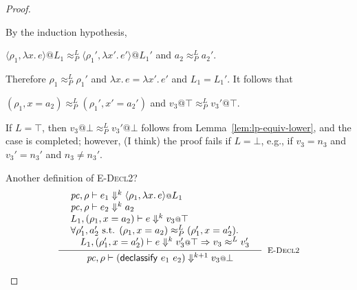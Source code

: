 \documentclass{article}
\makeatletter
\newcommand{\at}{\ensuremath{{\scriptstyle{@}}}}
\newcommand{\pc}{\ensuremath{{\mathit{pc}}}}
\theoremstyle{definition}
\makeatother
\begin{document}
\begin{proof}
\begin{description}
    By the induction hypothesis,
    \begin{description}
    \item
      \quad
      $\langle{\rho_1, \lambda{x}.\, e\rangle} \at L_1
      \approx^{L}_{P}
      \langle{\rho_1', \lambda{x'}.\, e'\rangle} \at L_1'$
      \quad and \quad
      $a_2 \approx^{L}_{P} a_2'$.
    \end{description}
    Therefore $\rho_1 \approx^{L}_{P} \rho_1'$ and
    $\lambda{x}.\, e = \lambda{x'}.\, e'$ and
    $L_1 = L_1'$.
    It follows that
    \begin{description}
    \item
      \quad
      $(\rho_1, x = a_2) \approx^{L}_{P} (\rho_1', x' = a_2')$
      \quad\quad\quad and \quad
      $v_3 \at \top \approx^{L}_{P} v_3' \at \top$.
    \end{description}
    If $L = \top$, then $v_3 \at \bot \approx^{L}_{P} v_3' \at \bot$ follows
    from Lemma~\ref{lem:lp-equiv-lower}, and the case is completed; however,
    (I think) the proof fails if $L = \bot$, e.g., if $v_3 = n_3$ and
    $v_3' = n_3'$ and $n_3 \not= n_3'$.

    Another definition of \textsc{E-Decl2}?
    \[
    \inference{
      {\begin{array}{l}
          \pc, \rho |- e_1 \Downarrow^{k}
          \langle{\rho_1, \lambda{x}.\, e\rangle} \at L_1
          \\
          \pc, \rho |- e_2 \Downarrow^{k} a_2
          \\
          L_1, (\rho_1, x = a_2) |- e \Downarrow^{k} v_3 \at \top
          \\
          \forall{\rho_1', a_2' \text{ s.t. }
            (\rho_1, x = a_2) \approx^{L}_{P} (\rho_1', x = a_2')}.\,
          \\\quad
          L_1, (\rho_1', x = a_2') |- e \Downarrow^{k} v_3' \at \top =>
          v_3 \approx^{L} v_3'
        \end{array}}
    }{
      \pc, \rho |- (\mathsf{declassify}\ e_1\ e_2) \Downarrow^{k+1} v_3 \at \bot
    }[\textsc{E-Decl2}]
    \]
  \end{description}
\end{proof}
\end{document}
